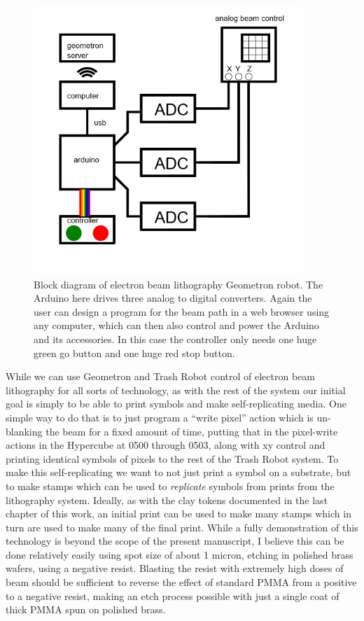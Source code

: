 \begin{figure}
	\centering
	\includegraphics[width=4in]{figures/machines/eblblockdiagram.png}
	\caption[eblblockdiagram]
	{Block diagram of electron beam lithography Geometron robot.  The Arduino here drives three analog to digital converters.  Again the user can design a program for the beam path in a web browser using any computer, which can then also control and power the Arduino and its accessories.  In this case the controller only needs one huge green go button and one huge red stop button.}
\end{figure}

While we can use Geometron and Trash Robot control of electron beam lithography for all sorts of technology, as with the rest of the system our initial goal is simply to be able to print symbols and make self-replicating media.  One simple way to do that is to just program a ``write pixel'' action which is un-blanking the beam for a fixed amount of time, putting that in the pixel-write actions in the Hypercube at 0500 through 0503, along with xy control and printing identical symbols of pixels to the rest of the Trash Robot system.  To make this self-replicating we want to not just print a symbol on a substrate, but to make stamps which can be used to \emph{replicate} symbols from prints from the lithography system.  Ideally, as with the clay tokens documented in the last chapter of this work, an initial print can be used to make many stamps which in turn are used to make many of the final print.  While a fully demonstration of this technology is beyond the scope of the present manuscript, I believe this can be done relatively easily using spot size of about 1 micron, etching in polished brass wafers, using a negative resist.  Blasting the resist with extremely high doses of beam should be sufficient to reverse the effect of standard PMMA from a positive to a negative resist, making an etch process possible with just a single coat of thick PMMA spun on polished brass.  